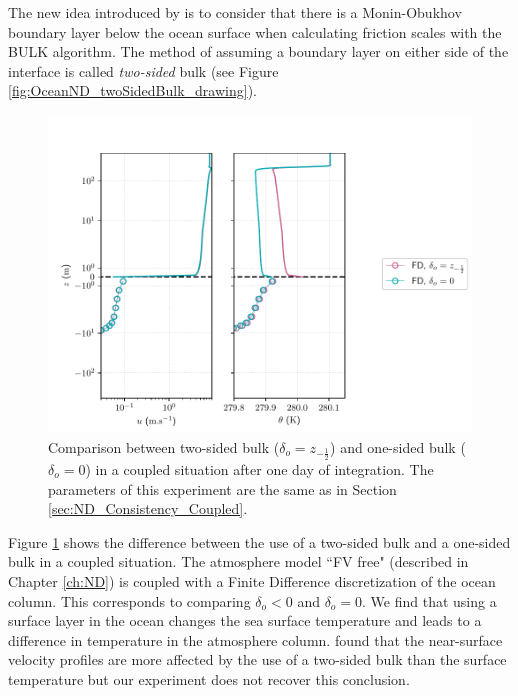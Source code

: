 The new idea introduced by \citep{pelletier_two-sided_2021} is to consider
that there is a Monin-Obukhov boundary layer 
below the ocean surface when calculating friction scales with the BULK algorithm. 
The method of assuming a boundary layer on either side of the interface is called
 \textit{two-sided} bulk (see Figure \ref{fig:OceanND_twoSidedBulk_drawing}).
	\begin{figure}
	\centering
\includegraphics[scale=0.6]{images/compare_two_sided_one_sided.pdf}
	\caption{Comparison between
	two-sided bulk ($\delta_o=z_{-\frac{1}{2}}$) and
	one-sided bulk ($\delta_o=0$) in a coupled
	situation after one day of integration. The parameters
	of this experiment are the same as in
	Section \ref{sec:ND_Consistency_Coupled}.
	}
	\label{fig:OceanND_twoSidedBulk_difference}
\end{figure}
\par
Figure \ref{fig:OceanND_twoSidedBulk_difference} shows the difference
between the use of a two-sided bulk and a one-sided bulk in
a coupled situation. The atmosphere model ``FV free"
(described in Chapter \ref{ch:ND}) is coupled with a Finite Difference
discretization of the ocean column.
This corresponds to comparing $\delta_o < 0$ and $\delta_o = 0$.
We find that using a surface layer in the ocean changes the
sea surface temperature and leads to a difference
in temperature in the atmosphere column.
\citep{pelletier_two-sided_2021} found that the near-surface
velocity profiles are more affected by the use of a
two-sided bulk than the surface temperature but our
experiment does not recover this conclusion.

